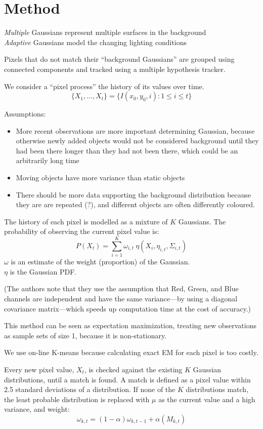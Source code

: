 \documentclass{article}
\begin{document}
\section{Method}
	\emph{Multiple} Gaussians represent multiple surfaces in the background\\
	\emph{Adaptive} Gaussians model the changing lighting conditions

	Pixels that do not match their ``background Gaussians'' are grouped using
	connected components and tracked using a multiple hypothesis tracker.

	We consider a ``pixel process'' the history of its values over time.
	$$\{X_1, \ldots, X_t \} = \{I(x_0, y_0, i) : 1 \leq i \leq t\}$$

	Assumptions:
	\begin{itemize}
		\item More recent observations are more important determining Gaussian,
			because otherwise newly added objects would not be considered
			background until they had been there longer than they had not been
			there, which could be an arbitrarily long time
		\item Moving objects have more variance than static objects
		\item There should be more data supporting the background distribution
			because they are are repeated (?), and different objects are often
			differently coloured.
	\end{itemize}

	The history of each pixel is modelled as a mixture of $K$ Gaussians. The
	probability of observing the current pixel value is:
	$$P(X_t) = \sum^K_{i=1} \omega_{i,t}~\eta
	(X_i, \eta_{i, t}, \Sigma_{i,t})$$
	$\omega$ is an estimate of the weight (proportion) of the Gaussian.\\
	$\eta$ is the Gaussian PDF.

	(The authors note that they use the assumption that Red, Green, and Blue
	channels are independent and have the same variance---by using a diagonal
	covariance matrix---which speeds up computation time at the cost of
	accuracy.)

	This method can be seen as expectation maximization, treating new
	observations as sample sets of size 1, because it is non-stationary.

	We use on-line K-means because calculating exact EM for each pixel is too
	costly.

	Every new pixel value, $X_t$, is checked against the existing $K$ Gaussian
	distributions, until a match is found. A match is defined as a pixel value
	within 2.5 standard deviations of a distribution.
	If none of the $K$ distributions match, the least probable distribution is
	replaced with $\mu$ as the current value and a high variance, and weight:
	$$\omega_{k,t} = (1 - \alpha) \omega_{k,t-1} + \alpha(M_{k,t})$$
\end{document}
